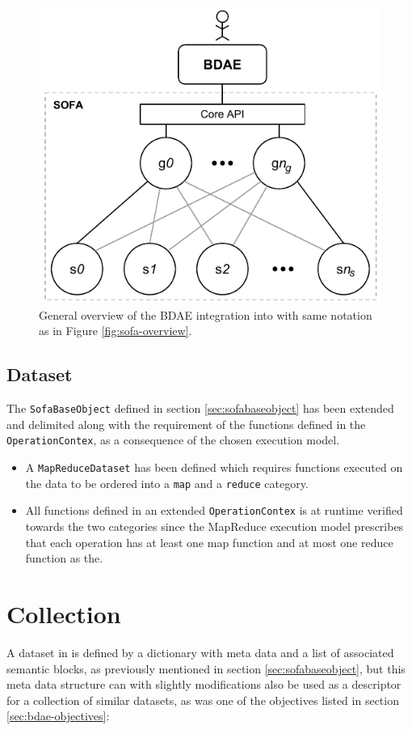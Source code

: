 \begin{figure}
	\centering
	\includegraphics[scale=0.9]{pdf/bdae-overview.pdf}
	\caption[General overview of the BDAE]{General overview of the BDAE integration into \CodeName with same notation as in Figure \ref{fig:sofa-overview}. \label{fig:bdae-overview}}
\end{figure}	


\subsection{Dataset}
The \texttt{SofaBaseObject} defined in section \ref{sec:sofabaseobject} has been extended and delimited along with the requirement of the functions defined in the \texttt{OperationContex}, as a consequence of the chosen execution model. 
\begin{itemize}
	\item A \texttt{MapReduceDataset} has been defined which requires functions executed on the data to be ordered into a \texttt{map} and a \texttt{reduce} category. 
	\item All functions defined in an extended \texttt{OperationContex} is at runtime verified towards the two categories since the MapReduce execution model prescribes that each operation has at least one map function and at most one reduce function as the.
\end{itemize}

\section{Collection}
A dataset in \CodeName is defined by a dictionary with meta data and a list of associated semantic blocks, as previously mentioned in section \ref{sec:sofabaseobject}, but this meta data structure can with slightly modifications also be used as a descriptor for a collection of similar datasets, as was one of the objectives listed in section \ref{sec:bdae-objectives}:


